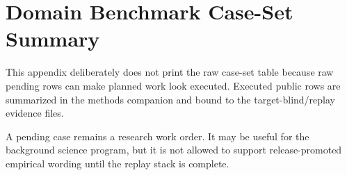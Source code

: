 \section{Domain Benchmark Case-Set Summary}

\label{sec:oc-core-1-3-domain-benchmark-caseset-summary}

This appendix deliberately does not print the raw case-set table because raw pending rows can make planned work look executed. Executed public rows are summarized in the methods companion and bound to the target-blind/replay evidence files.


A pending case remains a research work order. It may be useful for the background science program, but it is not allowed to support release-promoted empirical wording until the replay stack is complete.
